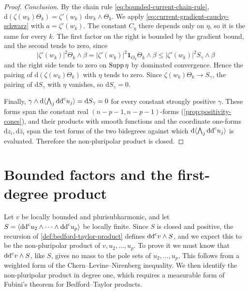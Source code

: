\begin{proof}
\emph{Conclusion.} By the chain rule \eqref{eq:bounded-current-chain-rule}, $\mathrm d(\zeta(w_k)\Theta_k)=\zeta'(w_k)\,\mathrm dw_k\wedge\Theta_k$. We apply \eqref{eq:current-gradient-cauchy-schwarz} with $a=\zeta'(w_k)$. The constant $C_\eta$ there depends only on $\eta$, so it is the same for every $k$. The first factor on the right is bounded by the gradient bound, and the second tends to zero, since
\[
 |\zeta'(w_k)|^2\Theta_k\wedge\beta
       =|\zeta'(w_k)|^2\mathbf1_{O_k}\Theta_k\wedge\beta
       \leq |\zeta'(w_k)|^2 S_\gamma\wedge\beta
\]
and the right side tends to zero on $\operatorname{Supp}\eta$ by dominated convergence. Hence the pairing of $\mathrm d(\zeta(w_k)\Theta_k)$ with $\eta$ tends to zero. Since $\zeta(w_k)\Theta_k\to S_\gamma$, the pairing of $\mathrm dS_\gamma$ with $\eta$ vanishes, so $\mathrm dS_\gamma=0$.

Finally, $\gamma\wedge\mathrm d\langle\bigwedge_j\mathrm{dd}^{\mathrm{c}} u_j\rangle=\mathrm dS_\gamma=0$ for every constant strongly positive $\gamma$. These forms span the constant real $(n-p-1,n-p-1)$-forms (\cref{prop:positivity-cones}), and their products with smooth functions and the coordinate one-forms $\mathrm dz_i,\mathrm d\bar z_i$ span the test forms of the two bidegrees against which $\mathrm d\langle\bigwedge_j\mathrm{dd}^{\mathrm{c}} u_j\rangle$ is evaluated. Therefore the non-pluripolar product is closed.
\end{proof}

\section{Bounded factors and the first-degree product}
\label{sec:nonpluripolar-bounded-factors}
Let $v$ be locally bounded and plurisubharmonic, and let $S=\langle\mathrm{dd}^{\mathrm{c}} u_2\wedge\cdots\wedge\mathrm{dd}^{\mathrm{c}} u_p\rangle$ be locally finite. Since $S$ is closed and positive, the recursion of \cref{def:bedford-taylor-product} defines $\mathrm{dd}^{\mathrm{c}} v\wedge S$, and we expect this to be the non-pluripolar product of $v,u_2,\ldots,u_p$. To prove it we must know that $\mathrm{dd}^{\mathrm{c}} v\wedge S$, like $S$, gives no mass to the pole sets of $u_2,\ldots,u_p$. This follows from a weighted form of the Chern--Levine--Nirenberg inequality. We then identify the non-pluripolar product in degree one, which requires a measurable form of Fubini's theorem for Bedford--Taylor products.

